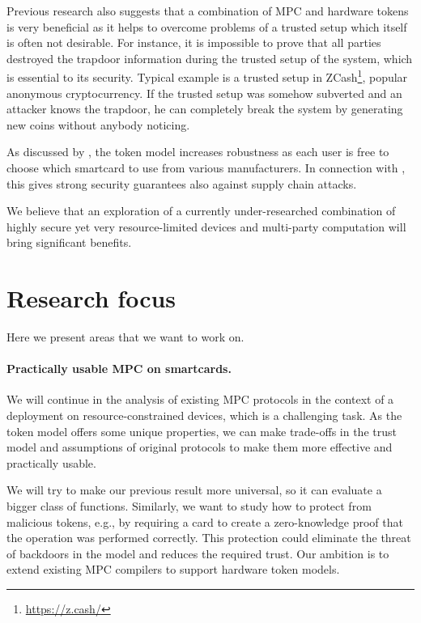 \documentclass[
  digital, %
  twoside, %
  table,   %
  lof,     %
  lot,     %
]{fithesis3}
\theoremstyle{definition}
\theoremstyle{remark}
\begin{document}
Previous research also suggests that a combination of MPC and hardware tokens is very beneficial as it helps to overcome problems of a trusted setup which  itself is often not desirable. For instance, it is impossible to prove that all parties destroyed the trapdoor information during the trusted setup of the system, which is essential to its security. Typical example is a trusted setup in ZCash\footnote{\url{https://z.cash/}}, popular anonymous cryptocurrency. If the trusted setup was somehow subverted and an attacker knows the trapdoor, he can completely break the system by generating new coins without anybody noticing.

As discussed by \cite{K07}, the token model increases robustness as each user is free to choose which smartcard to use from various manufacturers. In connection with \cite{2017-ccs-nemec}, this gives strong security guarantees also against supply chain attacks.

We believe that an exploration of a currently under-researched combination of highly secure yet very resource-limited devices and multi-party computation will bring significant benefits.

\section{Research focus}
Here we present areas that we want to work on.

\paragraph{Practically usable MPC on smartcards.}%
We will continue in the analysis of existing MPC protocols in the context of a deployment on resource-constrained devices, which is a challenging task.
As the token model offers some unique properties, we can make trade-offs in the trust model and assumptions of original protocols to make them more effective and practically usable. 

We will try to make our previous result \cite{2017-ccs-mavroudis} more universal, so it can evaluate a bigger class of functions. Similarly, we want to study how to protect from malicious tokens, e.g., by requiring a card to create a zero-knowledge proof that the operation was performed correctly.  This protection could eliminate the threat of backdoors in the model and reduces the required trust.
Our ambition is to extend existing MPC compilers to support hardware token models.
\end{document}
